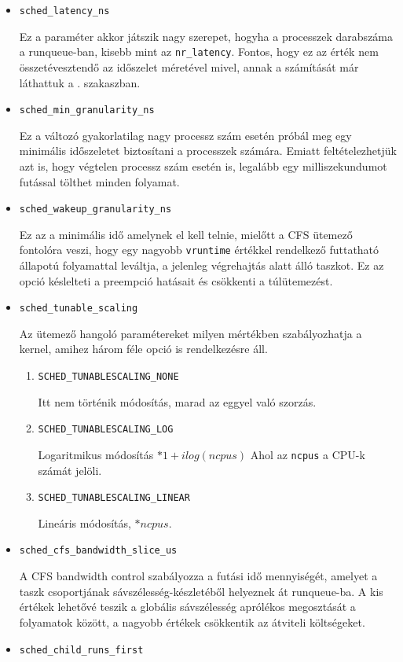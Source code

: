 \begin{itemize}
\item \texttt{sched\_latency\_ns}

Ez a paraméter akkor játszik nagy szerepet, hogyha a processzek darabszáma a runqueue-ban, kisebb mint az \texttt{nr\_latency}. Fontos, hogy ez az érték nem összetévesztendő az időszelet méretével mivel, annak a számítását már láthattuk a . szakaszban. 

\item \texttt{sched\_min\_granularity\_ns}

Ez a változó gyakorlatilag nagy processz szám esetén próbál meg egy minimális időszeletet biztosítani a processzek számára. Emiatt feltételezhetjük azt is, hogy végtelen processz szám esetén is, legalább egy milliszekundumot futással tölthet minden folyamat.

\item \texttt{sched\_wakeup\_granularity\_ns}

Ez az a minimális idő amelynek el kell telnie, mielőtt a CFS ütemező fontolóra veszi, hogy egy nagyobb \texttt{vruntime} értékkel rendelkező futtatható állapotú folyamattal leváltja, a jelenleg végrehajtás alatt álló taszkot.
Ez az opció késlelteti a preempció hatásait és csökkenti a túlütemezést. 

\item \texttt{sched\_tunable\_scaling}

Az ütemező hangoló paramétereket milyen mértékben szabályozhatja a kernel, amihez három féle opció is rendelkezésre áll.
\begin{enumerate}
\item \texttt{SCHED\_TUNABLESCALING\_NONE}

Itt nem történik módosítás, marad az eggyel való szorzás.
\item \texttt{SCHED\_TUNABLESCALING\_LOG}

Logaritmikus módosítás $*1+ilog(ncpus)$
Ahol az \texttt{ncpus} a CPU-k számát jelöli.

\item \texttt{SCHED\_TUNABLESCALING\_LINEAR}

Lineáris módosítás, $*ncpus$. 
\end{enumerate}

\item \texttt{sched\_cfs\_bandwidth\_slice\_us}

A CFS bandwidth control szabályozza a futási idő mennyiségét, amelyet a taszk csoportjának sávszélesség-készletéből helyeznek át runqueue-ba. A kis értékek lehetővé teszik a globális sávszélesség aprólékos megosztását a folyamatok között, a nagyobb értékek csökkentik az átviteli költségeket.
\item \texttt{sched\_child\_runs\_first}


\end{itemize}
